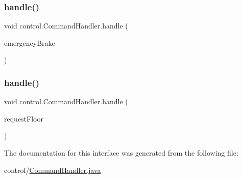 \mbox{\label{interfacecontrol_1_1_command_handler_a3e25f07c8c8ed0c33481a048d203f45e}} 
\subsubsection{\texorpdfstring{handle()}{handle()}\hspace{0.1cm}{\footnotesize\ttfamily [2/3]}}
{\footnotesize\ttfamily void control.\+Command\+Handler.\+handle (\begin{DoxyParamCaption}\item[{\mbox{\hyperlink{classcontrol_1_1command_1_1_emergency_brake}{Emergency\+Brake}}}]{emergency\+Brake }\end{DoxyParamCaption})}

\mbox{\label{interfacecontrol_1_1_command_handler_aff045a0f45642a078867df097c10eb22}} 
\subsubsection{\texorpdfstring{handle()}{handle()}\hspace{0.1cm}{\footnotesize\ttfamily [3/3]}}
{\footnotesize\ttfamily void control.\+Command\+Handler.\+handle (\begin{DoxyParamCaption}\item[{\mbox{\hyperlink{classcontrol_1_1command_1_1_floor_request}{Floor\+Request}}}]{request\+Floor }\end{DoxyParamCaption})}



The documentation for this interface was generated from the following file\+:\begin{DoxyCompactItemize}
\item 
control/\mbox{\hyperlink{_command_handler_8java}{Command\+Handler.\+java}}\end{DoxyCompactItemize}
